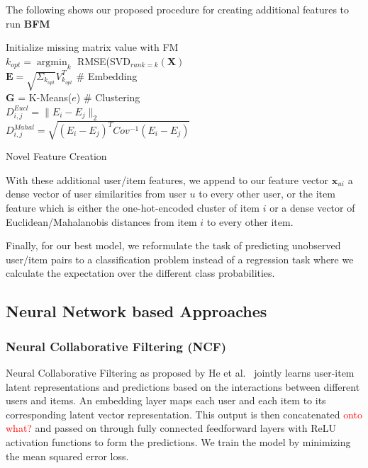 \documentclass[10pt,conference,compsocconf]{IEEEtran}
\DeclareMathOperator*{\argmin}{argmin}   %
\newcommand{\todo}[1]{\textcolor{red}{#1}}
\begin{document}
    The following  shows our proposed procedure for creating additional features to run \textbf{BFM}

    \begin{algorithm}
        Initialize missing matrix value with FM\\
        $k_{opt}=\argmin_{k}$ RMSE(SVD$_{rank=k}(\mathbf{ X })$\\
        $\mathbf{E} = \sqrt{\Sigma_{k_{opt}}}V_{k_{opt}}^T$ \# Embedding\\
        $\mathbf{ G }$ = K-Means($e$) \# Clustering\\
         {
             {
                $D_{i,j} ^{Eucl} = \|E_i - E_j\|_2$ \\
                $D_{i,j} ^{Mahal} = \sqrt{(E_i-E_j)^TCov^{-1}(E_i-E_j)}$
            }
        }
        \caption{Novel Feature Creation}
        \label{alg:algo1}
    \end{algorithm}

    With these additional user/item features, we append to our feature vector $\mathbf{x}_{ui}$ a dense vector of user similarities from user $u$ to every other user, or the item feature which is either the one-hot-encoded cluster of item $i$ or a dense vector of Euclidean/Mahalanobis distances from item $i$ to every other item.

    Finally, for our best model, we reformulate the task of predicting unobserved user/item pairs to a classification problem instead of a regression task where we calculate the expectation over the different class probabilities.

    \subsection{Neural Network based Approaches}

    \subsubsection{Neural Collaborative Filtering (NCF)}
    Neural Collaborative Filtering as proposed by He et al.~\cite{DBLP:journals/corr/abs-1708-05031}
    jointly learns user-item latent representations and predictions based on the interactions between
    different users and items.
    An embedding layer maps each user and each item to its corresponding latent vector representation.
    This output is then concatenated \todo{onto what?} and passed on through fully connected feedforward layers with ReLU activation functions to form the predictions.
    We train the model by minimizing the mean squared error loss.
\end{document}
